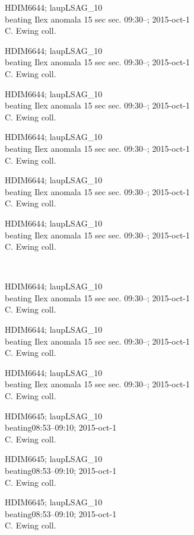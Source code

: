 \documentclass[2pt]{extarticle}
\begin{document}
\noindent
\parbox{0.16\textwidth}{\tiny \raggedright \rule[-0.3\baselineskip]{0pt}{10pt}HDIM6644; laupLSAG\_10\\ beating Ilex anomala 15 sec sec. 09:30--; 2015-oct-1\\ C. Ewing coll.}
\parbox{0.16\textwidth}{\tiny \raggedright \rule[-0.3\baselineskip]{0pt}{10pt}HDIM6644; laupLSAG\_10\\ beating Ilex anomala 15 sec sec. 09:30--; 2015-oct-1\\ C. Ewing coll.}
\parbox{0.16\textwidth}{\tiny \raggedright \rule[-0.3\baselineskip]{0pt}{10pt}HDIM6644; laupLSAG\_10\\ beating Ilex anomala 15 sec sec. 09:30--; 2015-oct-1\\ C. Ewing coll.}
\parbox{0.16\textwidth}{\tiny \raggedright \rule[-0.3\baselineskip]{0pt}{10pt}HDIM6644; laupLSAG\_10\\ beating Ilex anomala 15 sec sec. 09:30--; 2015-oct-1\\ C. Ewing coll.}
\parbox{0.16\textwidth}{\tiny \raggedright \rule[-0.3\baselineskip]{0pt}{10pt}HDIM6644; laupLSAG\_10\\ beating Ilex anomala 15 sec sec. 09:30--; 2015-oct-1\\ C. Ewing coll.}
\parbox{0.16\textwidth}{\tiny \raggedright \rule[-0.3\baselineskip]{0pt}{10pt}HDIM6644; laupLSAG\_10\\ beating Ilex anomala 15 sec sec. 09:30--; 2015-oct-1\\ C. Ewing coll.} \\ 
\vspace{0.001in} 

\noindent
\parbox{0.16\textwidth}{\tiny \raggedright \rule[-0.3\baselineskip]{0pt}{10pt}HDIM6644; laupLSAG\_10\\ beating Ilex anomala 15 sec sec. 09:30--; 2015-oct-1\\ C. Ewing coll.}
\parbox{0.16\textwidth}{\tiny \raggedright \rule[-0.3\baselineskip]{0pt}{10pt}HDIM6644; laupLSAG\_10\\ beating Ilex anomala 15 sec sec. 09:30--; 2015-oct-1\\ C. Ewing coll.}
\parbox{0.16\textwidth}{\tiny \raggedright \rule[-0.3\baselineskip]{0pt}{10pt}HDIM6644; laupLSAG\_10\\ beating Ilex anomala 15 sec sec. 09:30--; 2015-oct-1\\ C. Ewing coll.}
\parbox{0.16\textwidth}{\tiny \raggedright \rule[-0.3\baselineskip]{0pt}{10pt}HDIM6645; laupLSAG\_10\\ beating08:53--09:10; 2015-oct-1\\ C. Ewing coll.}
\parbox{0.16\textwidth}{\tiny \raggedright \rule[-0.3\baselineskip]{0pt}{10pt}HDIM6645; laupLSAG\_10\\ beating08:53--09:10; 2015-oct-1\\ C. Ewing coll.}
\parbox{0.16\textwidth}{\tiny \raggedright \rule[-0.3\baselineskip]{0pt}{10pt}HDIM6645; laupLSAG\_10\\ beating08:53--09:10; 2015-oct-1\\ C. Ewing coll.} \\ 
\vspace{0.001in} 
\end{document}
